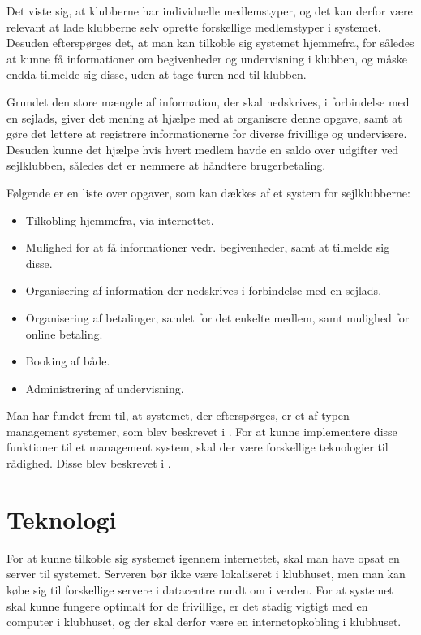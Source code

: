 Det viste sig, at klubberne har individuelle medlemstyper, og det kan derfor være relevant at lade klubberne
selv oprette forskellige medlemstyper i systemet. 
Desuden efterspørges det, at man kan tilkoble sig systemet
hjemmefra, for således at kunne få informationer om begivenheder og undervisning i klubben, og måske endda
tilmelde sig disse, uden at tage turen ned til klubben.

Grundet den store mængde af information, der skal nedskrives, i forbindelse med en sejlads, giver det mening at hjælpe med at organisere denne opgave, samt at gøre det lettere at registrere informationerne for diverse
frivillige og undervisere. 
Desuden kunne det hjælpe hvis hvert medlem havde en saldo over udgifter ved sejlklubben, således det er nemmere at håndtere brugerbetaling.

Følgende er en liste over opgaver, som kan dækkes af et system for sejlklubberne:

\begin{itemize}
  \item Tilkobling hjemmefra, via internettet.
  \item Mulighed for at få informationer vedr. begivenheder, samt at tilmelde sig disse.
  \item Organisering af information der nedskrives i forbindelse med en sejlads. 
  \item Organisering af betalinger, samlet for det enkelte medlem, samt mulighed for online betaling.
  \item Booking af både.
  \item Administrering af undervisning.
\end{itemize}

Man har fundet frem til, at systemet, der efterspørges, er et af typen management systemer, som blev beskrevet i
. 
For at kunne implementere disse funktioner til et management system, skal der være forskellige teknologier til rådighed. 
Disse blev beskrevet i .

\section{Teknologi}

For at kunne tilkoble sig systemet igennem internettet, skal man have opsat en server til systemet. 
Serveren bør ikke være lokaliseret i klubhuset, men man kan købe sig til forskellige servere i datacentre rundt om i verden. 
For at systemet skal kunne fungere optimalt for de frivillige, er det stadig vigtigt med en computer i
klubhuset, og der skal derfor være en internetopkobling i klubhuset.

